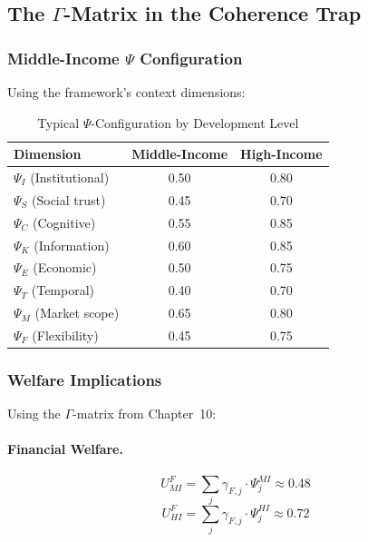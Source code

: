 \subsection{The $\Gamma$-Matrix in the Coherence Trap}

\subsubsection{Middle-Income $\Psi$ Configuration}

Using the framework's context dimensions:

\begin{table}[htbp]
\centering
\caption{Typical $\Psi$-Configuration by Development Level}
\label{tab:psi-by-income}
\begin{tabular}{@{}lcc@{}}
\toprule
\textbf{Dimension} & \textbf{Middle-Income} & \textbf{High-Income} \\
\midrule
$\Psi_I$ (Institutional) & 0.50 & 0.80 \\
$\Psi_S$ (Social trust) & 0.45 & 0.70 \\
$\Psi_C$ (Cognitive) & 0.55 & 0.85 \\
$\Psi_K$ (Information) & 0.60 & 0.85 \\
$\Psi_E$ (Economic) & 0.50 & 0.75 \\
$\Psi_T$ (Temporal) & 0.40 & 0.70 \\
$\Psi_M$ (Market scope) & 0.65 & 0.80 \\
$\Psi_F$ (Flexibility) & 0.45 & 0.75 \\
\bottomrule
\end{tabular}
\end{table}

\subsubsection{Welfare Implications}

Using the $\Gamma$-matrix from Chapter~10:

\paragraph{Financial Welfare.}
\begin{equation}
U^F_{MI} = \sum_j \gamma_{F,j} \cdot \Psi_j^{MI} \approx 0.48
\end{equation}
\begin{equation}
U^F_{HI} = \sum_j \gamma_{F,j} \cdot \Psi_j^{HI} \approx 0.72
\end{equation}

